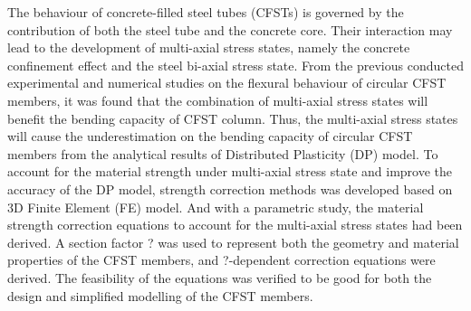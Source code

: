 \abstract
The behaviour of concrete-filled steel tubes (CFSTs) is governed by the contribution of both the steel tube and the concrete core. Their interaction may lead to the development of multi-axial stress states, namely the concrete confinement effect and the steel bi-axial stress state. From the previous conducted experimental and numerical studies on the flexural behaviour of circular CFST members, it was found that the combination of multi-axial stress states will benefit the bending capacity of CFST column. Thus, the multi-axial stress states will cause the underestimation on the bending capacity of circular CFST members from the analytical results of Distributed Plasticity (DP) model. To account for the material strength under multi-axial stress state and improve the accuracy of the DP model, strength correction methods was developed based on 3D Finite Element (FE) model. And with a parametric study, the material strength correction equations to account for the multi-axial stress states had been derived. A section factor ? was used to represent both the geometry and material properties of the CFST members, and ?-dependent correction equations were derived. The feasibility of the equations was verified to be good for both the design and simplified modelling of the CFST members.